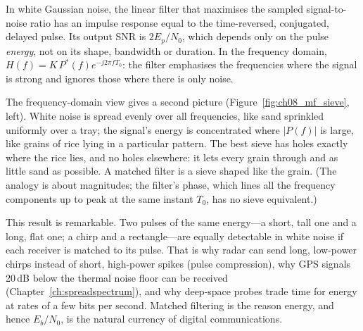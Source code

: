 \begin{keyidea}
In white Gaussian noise, the linear filter that maximises the sampled signal-to-noise ratio
has an impulse response equal to the time-reversed, conjugated, delayed pulse. Its output SNR
is $2E_p/N_0$, which depends only on the pulse \emph{energy}, not on its shape, bandwidth or
duration. In the frequency domain, $H(f)=K\,P^*(f)e^{-j2\pi fT_0}$: the filter emphasises the
frequencies where the signal is strong and ignores those where there is only noise.
\end{keyidea}

\begin{analogy}
The frequency-domain view gives a second picture (Figure~\ref{fig:ch08_mf_sieve}, left). White
noise is spread evenly over all frequencies, like sand sprinkled uniformly over a tray; the
signal's energy is concentrated where $|P(f)|$ is large, like grains of rice lying in a
particular pattern. The best sieve has holes exactly where the rice lies, and no holes
elsewhere: it lets every grain through and as little sand as possible. A matched filter is a
sieve shaped like the grain. (The analogy is about magnitudes; the filter's phase, which lines
all the frequency components up to peak at the same instant $T_0$, has no sieve equivalent.)
\end{analogy}


This result is remarkable. Two pulses of the same energy---a short, tall one and a long, flat
one; a chirp and a rectangle---are equally detectable in white noise if each receiver is
matched to its pulse. That is why radar can send long, low-power chirps instead of short,
high-power spikes (pulse compression), why GPS signals 20\,dB below the thermal noise floor can
be received (Chapter~\ref{ch:spreadspectrum}), and why deep-space probes trade time for
energy at rates of a few bits per second. Matched filtering is the reason energy, and hence
$E_b/N_0$, is the natural currency of digital communications.


